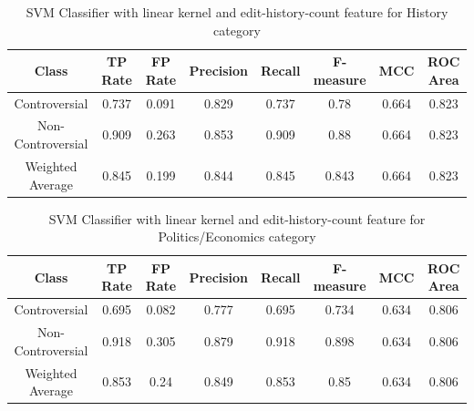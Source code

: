 \documentclass[twocolumn]{article}
\begin{document}
\begin{table}[t]
 	{\centering
 	\hfill{}
 	\begin{tabular}{|c|c|c|c|c|c|c|c|}
 		\hline
 		\textbf{Class} & \textbf{TP Rate} & \textbf{FP Rate} & \textbf{Precision} & \textbf{Recall} & \textbf{F-measure} & \textbf{MCC} & \textbf{ROC Area} \\
 		\hline
 		\hline
 		Controversial & 0.737 & 0.091 & 0.829 & 0.737 & 0.78 & 0.664 & 0.823 \\
 		Non-Controversial & 0.909 & 0.263 & 0.853 & 0.909 & 0.88 & 0.664 & 0.823\\
 		Weighted Average & 0.845 & 0.199 & 0.844 & 0.845 & 0.843 & 0.664 & 0.823 \\
 		\hline
 	\end{tabular}}
 	\hfill{}
 	\centering
 	\caption{SVM Classifier with linear kernel and edit-history-count feature for History category}
 	\label{tab:1}
 \end{table}
 \begin{table}[t]
	{ 	\centering
		\hfill{}
 	\begin{tabular}{|c|c|c|c|c|c|c|c|}
 		\hline
 		\textbf{Class} & \textbf{TP Rate} & \textbf{FP Rate} & \textbf{Precision} & \textbf{Recall} & \textbf{F-measure} & \textbf{MCC} & \textbf{ROC Area} \\
 		\hline
 		\hline
 		Controversial & 0.695 & 0.082 & 0.777 & 0.695 & 0.734 & 0.634 & 0.806 \\
 		Non-Controversial & 0.918 & 0.305 & 0.879 & 0.918 & 0.898 & 0.634 & 0.806\\
 		Weighted Average & 0.853 & 0.24 & 0.849 & 0.853 & 0.85 & 0.634 & 0.806 \\
 		\hline
 	\end{tabular}}
 	\hfill{}
 	\centering
 	\caption{SVM Classifier with linear kernel and edit-history-count feature for Politics/Economics category}
 	\label{tab:2}
 \end{table}
\end{document}
